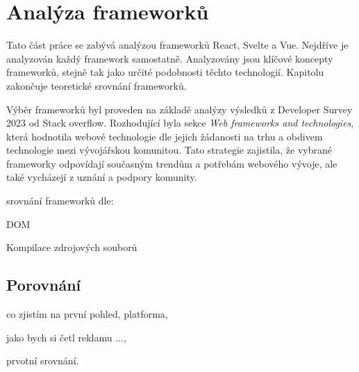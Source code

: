 \section{Analýza frameworků}

Tato část práce se zabývá analýzou frameworků React, Svelte a Vue. Nejdříve je analyzován každý framework samostatně. 
Analyzovány jsou klíčové koncepty frameworků, stejně tak jako určité podobnosti těchto technologií. Kapitolu zakončuje teoretické srovnání frameworků.

Výběr frameworků byl proveden na základě analýzy výsledků z Developer Survey 2023 od Stack overflow. 
Rozhodující byla sekce \textit{Web frameworks and technologies}, která hodnotila webové technologie dle jejich žádanosti na trhu a obdivem technologie mezi vývojářskou komunitou. 
Tato strategie zajistila, že vybrané frameworky odpovídají současným trendům a potřebám webového vývoje, ale také vycházejí z uznání a podpory komunity.

\begin{citemize}
	\item srovnání frameworků dle:
	\begin{cenumerate}
		\item DOM %
		\item Kompilace zdrojových souborů %
	\end{cenumerate}
\end{citemize}







\subsection{Porovnání}

\begin{citemize}
	\item co zjistím na první pohled, platforma,
	\item jako bych si četl reklamu ...,
	\item prvotní srovnání.
\end{citemize}
